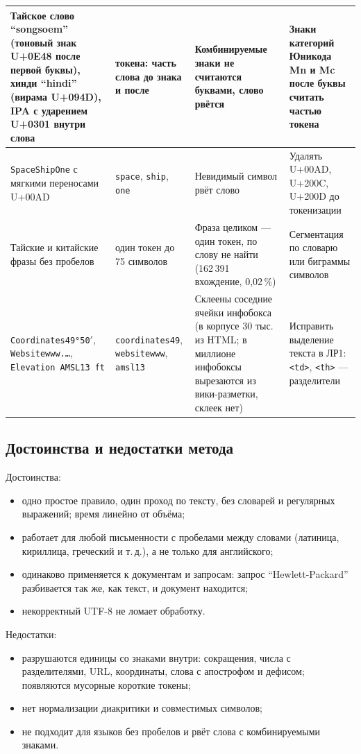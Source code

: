 {\begin{longtable}{|>{\raggedright\arraybackslash}p{}|>{\raggedright\arraybackslash}p{}|>{\raggedright\arraybackslash}p{}|>{\raggedright\arraybackslash}p{}|}
\hline
Тайское слово \enquote{songsoem} (тоновый знак U+0E48 после первой буквы), хинди \enquote{hindi} (вирама U+094D), IPA с ударением U+0301 внутри слова & 2 токена: часть слова до знака и после & Комбинируемые знаки не считаются буквами, слово рвётся & Знаки категорий Юникода Mn и Mc после буквы считать частью токена \\
\hline
\texttt{SpaceShipOne} с мягкими переносами U+00AD & \texttt{space}, \texttt{ship}, \texttt{one} & Невидимый символ рвёт слово & Удалять U+00AD, U+200C, U+200D до токенизации \\
\hline
Тайские и китайские фразы без пробелов & один токен до 75 символов & Фраза целиком --- один токен, по слову не найти (162\,391 вхождение, 0,02\,\%) & Сегментация по словарю или биграммы символов \\
\hline
\texttt{Coordinates49°50$'$}, \texttt{Websitewww.\ldots}, \texttt{Elevation AMSL13 ft} & \texttt{coordinates49}, \texttt{websitewww}, \texttt{amsl13} & Склеены соседние ячейки инфобокса (в корпусе 30 тыс. из HTML; в миллионе инфобоксы вырезаются из вики-разметки, склеек нет) & Исправить выделение текста в ЛР1: \texttt{<td>}, \texttt{<th>} --- разделители \\
\hline
\end{longtable}
}

\subsection{Достоинства и недостатки метода}
Достоинства:
\begin{itemize}
    \item одно простое правило, один проход по тексту, без словарей и регулярных выражений; время линейно от объёма;
    \item работает для любой письменности с пробелами между словами (латиница, кириллица, греческий и т.\,д.), а не только для английского;
    \item одинаково применяется к документам и запросам: запрос \enquote{Hewlett-Packard} разбивается так же, как текст, и документ находится;
    \item некорректный UTF-8 не ломает обработку.
\end{itemize}
Недостатки:
\begin{itemize}
    \item разрушаются единицы со знаками внутри: сокращения, числа с разделителями, URL, координаты, слова с апострофом и дефисом; появляются мусорные короткие токены;
    \item нет нормализации диакритики и совместимых символов;
    \item не подходит для языков без пробелов и рвёт слова с комбинируемыми знаками.
\end{itemize}

